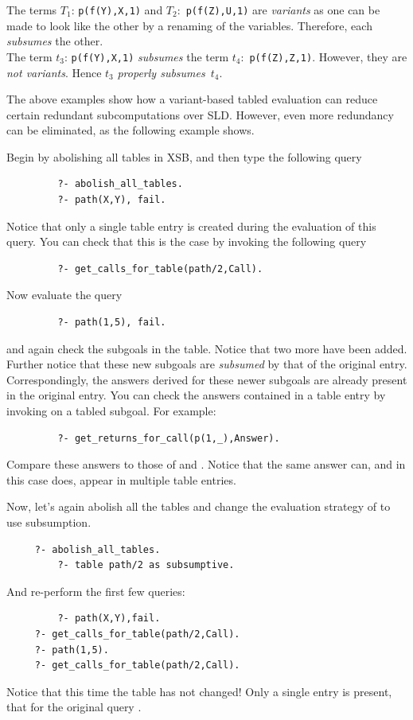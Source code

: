 \begin{example} \rm 
The terms $T_1$: {\tt p(f(Y),X,1)} and $T_2$:~{\tt p(f(Z),U,1)} are
\emph{variants} as one can be made to look like the other by a
renaming of the variables.  Therefore, each \emph{subsumes} the other. \\
\noindent The term $t_3$: {\tt p(f(Y),X,1)} \emph{subsumes} the term
$t_4$:~{\tt p(f(Z),Z,1)}.  However, they are \emph{not variants}.  Hence
$t_3$ \emph{properly subsumes}~$t_4$.\fillBox
\end{example}

The above examples show how a variant-based tabled evaluation can
reduce certain redundant subcomputations over SLD\@.  However, even
more redundancy can be eliminated, as the following example shows.

\begin{exercise} \label{ex:VarVsSub} \rm
Begin by abolishing all tables in XSB, and then type the following query
\begin{verbatim}
         ?- abolish_all_tables.
         ?- path(X,Y), fail.
\end{verbatim}
Notice that only a single table entry is created during the evaluation
of this query.  You can check that this is the case by invoking the
following query
\begin{verbatim}
         ?- get_calls_for_table(path/2,Call).
\end{verbatim}
Now evaluate the query
\begin{verbatim}
         ?- path(1,5), fail.
\end{verbatim}
and again check the subgoals in the table.  Notice that two more have
been added.  Further notice that these new subgoals are
\emph{subsumed} by that of the original entry.  Correspondingly, the
answers derived for these newer subgoals are already present in the
original entry.  You can check the answers contained in a table entry
by invoking  on a tabled subgoal.  For
example:
\begin{verbatim}
         ?- get_returns_for_call(p(1,_),Answer).
\end{verbatim}
Compare these answers to those of  and .
Notice that the same answer can, and in this case does, appear in
multiple table entries.

Now, let's again abolish all the tables and change the evaluation
strategy of  to use subsumption.
\begin{verbatim}
	 ?- abolish_all_tables.
         ?- table path/2 as subsumptive.
\end{verbatim}
And re-perform the first few queries:
\begin{verbatim}
         ?- path(X,Y),fail.
	 ?- get_calls_for_table(path/2,Call).
	 ?- path(1,5).
	 ?- get_calls_for_table(path/2,Call).
\end{verbatim}
Notice that this time the table has not changed!  Only a single entry
is present, that for the original query .
\end{exercise}
